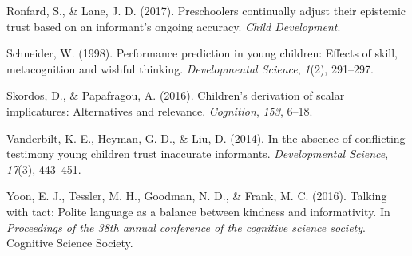 \documentclass[10pt, letterpaper]{article}
\begin{document}
\hypertarget{ref-ronfard2017preschoolers}{}
Ronfard, S., \& Lane, J. D. (2017). Preschoolers continually adjust
their epistemic trust based on an informant's ongoing accuracy.
\emph{Child Development}.

\hypertarget{ref-schneider1998performance}{}
Schneider, W. (1998). Performance prediction in young children: Effects
of skill, metacognition and wishful thinking. \emph{Developmental
Science}, \emph{1}(2), 291--297.

\hypertarget{ref-skordos2016children}{}
Skordos, D., \& Papafragou, A. (2016). Children's derivation of scalar
implicatures: Alternatives and relevance. \emph{Cognition}, \emph{153},
6--18.

\hypertarget{ref-vanderbilt2014absence}{}
Vanderbilt, K. E., Heyman, G. D., \& Liu, D. (2014). In the absence of
conflicting testimony young children trust inaccurate informants.
\emph{Developmental Science}, \emph{17}(3), 443--451.

\hypertarget{ref-yoon2016talking}{}
Yoon, E. J., Tessler, M. H., Goodman, N. D., \& Frank, M. C. (2016).
Talking with tact: Polite language as a balance between kindness and
informativity. In \emph{Proceedings of the 38th annual conference of the
cognitive science society}. Cognitive Science Society.
\end{document}
